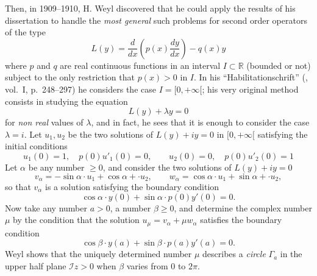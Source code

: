 \documentclass[12pt,a4paper,leqno,twoside]{extbook}
\newcommand{\R}{\mathbb{R}}
\begin{document}
Then, in 1909--1910, H. Weyl discovered that he could apply the results of his dissertation to handle the \emph{most general} such problems for second order operators of the type
\begin{equation}
    \label{eq:7.22}
    L(y) = \frac{d}{dx} \left(p(x) \frac{dy}{dx}\right) - q(x)y
\end{equation}
where \(p\) and \(q\) are real continuous functions in an interval \(I \subset \R\) (bounded or not) subject to the only restriction that \(p(x) > 0\) in \(I\). In his ``Habilitationschrift'' (\cite{227}, vol.~I, p.~248--297) he considers the case \(I = [0,+\infty[\); his very original method consists in studying the equation
\begin{equation}
    \label{eq:7.23}
    L(y) + \lambda y = 0
\end{equation}
for \emph{non real} values of \(\lambda\), and in fact, he sees that it is enough to consider the case \(\lambda = i\). Let \(u_1, u_2\) be the two solutions of \(L(y) + iy = 0\) in \([0,+\infty[\) satisfying the initial conditions
\[
    u_1(0) = 1, \quad p(0)u'_1(0) = 0,
    \qquad
    u_2(0) = 0, \quad p(0)u'_2(0) = 1
\]
Let \(\alpha\) be any number \(\geq 0\), and consider the two solutions of \(L(y) + iy = 0\)
\[
    v_\alpha = -\sin{\alpha \cdot u_1} + \cos{\alpha + \cdot u_2},
    \qquad
    w_\alpha = \cos{\alpha \cdot u_1} + \sin{\alpha + \cdot u_2},
\]
so that \(v_\alpha\) is a solution satisfying the boundary condition
\begin{equation}
    \label{eq:7.24}
    \cos{\alpha \cdot y(0)} + \sin{\alpha \cdot p(0)y'(0)} = 0.
\end{equation}
Now take any number \(a > 0\), a number \(\beta \geq 0\), and determine the complex number \(\mu\) by the condition that the solution \(u_\mu = v_\alpha + \mu w_\alpha\) satisfies the boundary condition
\begin{equation}
    \label{eq:7.25}
    \cos{\beta \cdot y(a)} + \sin{\beta \cdot p(a)y'(a)} = 0.
\end{equation}
Weyl shows that the uniquely determined number \(\mu\) describes a \emph{circle} \(\Gamma_a\) in the upper half plane \(\mathcal{I} z > 0\) when \(\beta\) varies from 0 to \(2\pi\).
\end{document}

